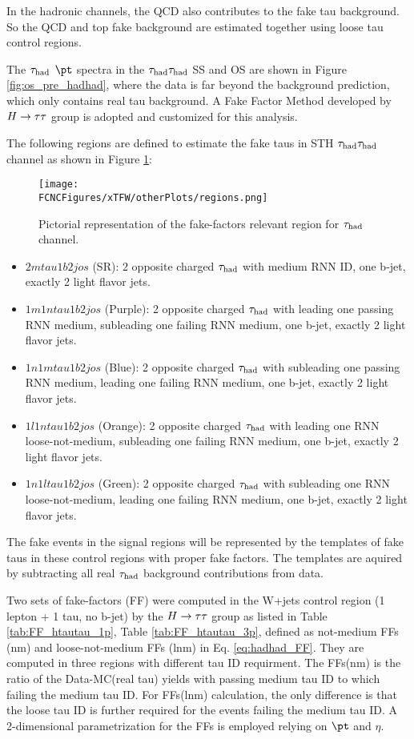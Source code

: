 In the hadronic channels, the QCD also contributes to the fake tau background. So the QCD and top fake background are estimated together using loose tau control regions.

The $\tau_\text{had}$ $\pt$ spectra in the $\tau_\text{had}{}\tau_\text{had}$ SS and OS are shown in Figure \ref{fig:os_pre_hadhad}, where the data is far beyond the background prediction, which only contains real tau background. A Fake Factor Method developed by $H \rightarrow \tau\tau$ group \cite{Htautau-note} is adopted and customized for this analysis. 

The following regions are defined to estimate the fake taus in STH $\tau_\text{had}{}\tau_\text{had}$ channel as shown in Figure \ref{fig:regions_hadhad}:

\begin{figure}[htb]
\centering
\texttt{[image: \\FCNCFigures/xTFW/otherPlots/regions.png]}
\caption{Pictorial representation of the fake-factors relevant region for $\tau_\text{had}$ channel.}
\label{fig:regions_hadhad}
\end{figure}

\begin{itemize}
\item{$2mtau1b2jos$ (SR): 2 opposite charged $\tau_\text{had}$ with medium RNN ID, one b-jet, exactly 2 light flavor jets.}
\item{$1m1ntau1b2jos$ (Purple): 2 opposite charged $\tau_\text{had}$ with leading one passing RNN medium, subleading one failing RNN medium, one b-jet, exactly 2 light flavor jets.}
\item{$1n1mtau1b2jos$ (Blue): 2 opposite charged $\tau_\text{had}$ with subleading one passing RNN medium, leading one failing RNN medium, one b-jet, exactly 2 light flavor jets.}
\item{$1l1ntau1b2jos$ (Orange): 2 opposite charged $\tau_\text{had}$ with leading one RNN loose-not-medium, subleading one failing RNN medium, one b-jet, exactly 2 light flavor jets.}
\item{$1n1ltau1b2jos$ (Green): 2 opposite charged $\tau_\text{had}$ with subleading one RNN loose-not-medium, leading one failing RNN medium, one b-jet, exactly 2 light flavor jets.}
\end{itemize}

The fake events in the signal regions will be represented by the templates of fake taus in these control regions with proper fake factors. The templates are aquired by subtracting all real $\tau_\text{had}$ background contributions from data.

Two sets of fake-factors (FF) were computed in the W+jets control region (1 lepton + 1 tau, no b-jet) by the $H \rightarrow \tau\tau$ group \cite{Htautau-note} as listed in Table \ref{tab:FF_htautau_1p}, Table \ref{tab:FF_htautau_3p}, defined as not-medium FFs (nm) and loose-not-medium FFs (lnm) in Eq. \ref{eq:hadhad_FF}. They are computed in three regions with different tau ID requirment. The FFs(nm) is the ratio of the Data-MC(real tau) yields with passing medium tau ID to which failing the medium tau ID. For FFs(lnm) calculation, the only difference is that the loose tau ID is further required for the events failing the medium tau ID. A 2-dimensional parametrization for the FFs is employed relying on $\pt$ and $\eta$.

